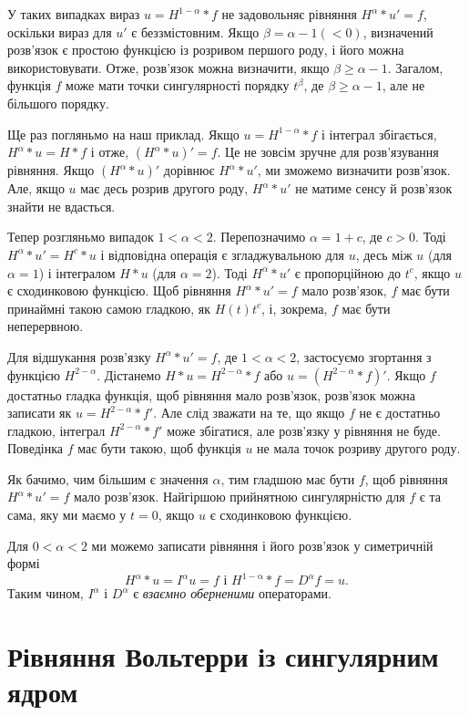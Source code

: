 \documentclass[14pt,twoside]{extreport}
\theoremstyle{mystyle}
\numberwithin{equation}{chapter}
\begin{document}
У таких випадках вираз $u=H^{1-\alpha}*f$ не задовольняє рівняння $H^{\alpha}*u'=f$, оскільки вираз для $u'$ є беззмістовним. Якщо $\beta=\alpha-1(<0)$, визначений розв'язок є простою функцією із розривом першого роду, і його можна використовувати. Отже, розв'язок можна визначити, якщо $\beta\geqslant \alpha-1$. Загалом, функція $f$ може мати точки сингулярності порядку $t^{\beta}$, де $\beta\geqslant \alpha-1$, але не більшого порядку.

Ще раз погляньмо на наш приклад. Якщо $u=H^{1-\alpha}*f$ і інтеграл збігається, $H^{\alpha}*u=H*f$ і отже, $(H^{\alpha}*u)'=f$. Це не зовсім зручне для розв'язування рівняння. Якщо $(H^{\alpha}*u)'$ дорівнює $H^{\alpha}*u'$, ми зможемо визначити розв'язок. Але, якщо $u$ має десь розрив другого роду, $H^{\alpha}*u'$ не матиме сенсу й розв'язок знайти не вдасться.

Тепер розгляньмо випадок $1<\alpha<2$. Перепозначимо $\alpha=1+c$, де $c>0$. Тоді $H^{\alpha}*u'=H^{c}*u$ і відповідна операція є згладжувальною для $u$, десь між $u$ (для $\alpha=1$) і інтегралом $H*u$ (для $\alpha=2$). Тоді $H^{\alpha}*u'$ є пропорційною до $t^{c}$, якщо $u$ є сходинковою функцією. Щоб рівняння $H^{\alpha}*u'=f$ мало розв'язок, $f$ має бути принаймні такою самою гладкою, як $H(t)t^{c}$, і, зокрема, $f$ має бути неперервною.

Для відшукання розв'язку $H^{\alpha}*u'=f$, де $1<\alpha<2$, застосуємо згортання з функцією $H^{2-\alpha}$. Дістанемо $H*u=H^{2-\alpha}*f$ або $u=(H^{2-\alpha}*f)'$. Якщо $f$ достатньо гладка функція, щоб рівняння мало розв'язок, розв'язок можна записати як $u=H^{2-\alpha}*f'$. Але слід зважати на те, що якщо $f$ не є достатньо гладкою, інтеграл $H^{2-\alpha}*f'$ може збігатися, але розв'язку у рівняння не буде. Поведінка $f$ має бути такою, щоб функція $u$ не мала точок розриву другого роду.

Як бачимо, чим більшим є значення $\alpha$, тим гладшою має бути $f$, щоб рівняння $H^{\alpha}*u'=f$ мало розв'язок. Найгіршою прийнятною сингулярністю для $f$ є та сама, яку ми маємо у $t=0$, якщо $u$ є сходинковою функцією.

Для $0<\alpha<2$ ми можемо записати рівняння і його розв'язок у симетричній формі
\begin{equation}
H^{\alpha}*u = I^{\alpha} u = f \textrm{ і } H^{1-\mathrm{\alpha}}*f = D^{\alpha} f = u.
\end{equation}
Таким чином, $I^{\alpha}$ і $D^{\alpha}$ є \emph{взаємно оберненими} операторами.

\section{Рівняння Вольтерри із сингулярним ядром}
\end{document}

